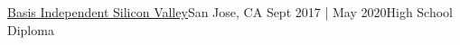 \resumeSubheadingEdu
{\href{https://siliconvalley.basisindependent.com/}{Basis Independent Silicon Valley}}{San Jose, CA}
{Sept 2017 | May 2020}{High School Diploma }
